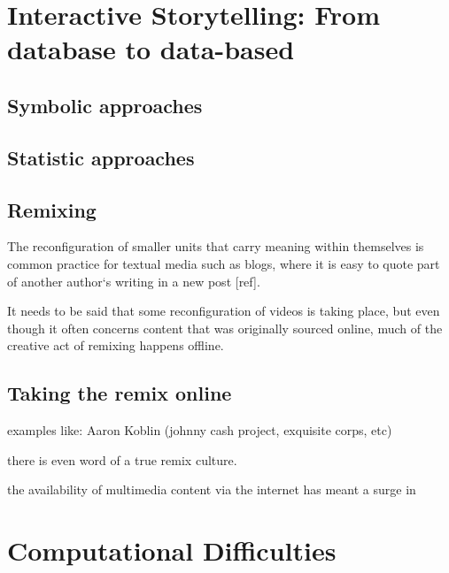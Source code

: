 \section{Interactive Storytelling: From database to data-based}
\label{ch:storytelling}
\subsection{Symbolic approaches}
\label{sec:symbolic}

\cite{Vilmos:2011wv,RodrigoLaiolaGuimaraes:2011tl,Ursu:2009gc}

\subsection{Statistic approaches}
\label{sec:statistic}

\subsection{Remixing}

The reconfiguration of smaller units that carry meaning within themselves is common practice for textual media such as blogs, where it is easy to quote part of  another author`s writing in a new post [ref]. 

It needs to be said that some reconfiguration of videos is taking place, but even though it often concerns content that was originally sourced online, much of the creative act of remixing happens offline.


\subsection{Taking the remix online}

examples like: Aaron Koblin (johnny cash project, exquisite corps, etc)

there is even word of a true remix culture.

the availability of multimedia content via the internet has meant a surge in 


\section{Computational Difficulties}







